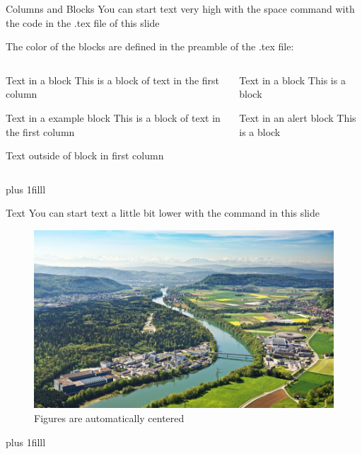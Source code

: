 \documentclass[aspectratio=43]{beamer}
\begin{document}
\begin{frame}{Columns and Blocks}
  You can start text very high with the space command with the code in the  .tex file of this slide

  The color of the blocks are defined in the preamble of the .tex file:
  \begin{columns}
    \begin{column}[T]{4cm}
      \centering
      \begin{block}{Text in a block}
        This is a block of text in the first column
      \end{block}
      \begin{exampleblock}{Text in a example block}
        This is a block of text in the first column
      \end{exampleblock}
      Text outside of block in first column
    \end{column}
    \begin{column}[T]{4cm}
      \begin{block}{Text in a block}
        This is a block 
      \end{block}
      \begin{alertblock}{Text in an alert block}
        This is a block
      \end{alertblock}
    \end{column}
  \end{columns}
    
    \vskip 0pt plus 1filll
 \end{frame}


 \begin{frame}{Text}
   \vspace*{3.7ex}
  You can start text a little bit lower with the command in this slide
  \begin{figure}
    \includegraphics[width=0.3\pagewidth]{PSIlandscape}
    \caption{Figures are automatically centered}
    \label{fig:PSI}
    \end{figure}

     \vskip 0pt plus 1filll
\end{frame}

  
\end{document}
